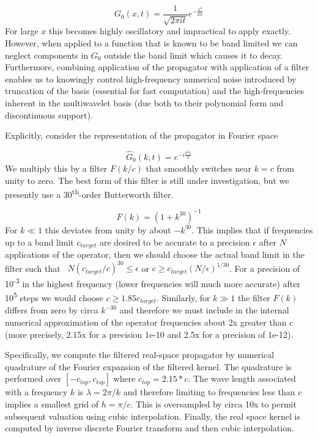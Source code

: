 \documentclass[letterpaper]{article}
\begin{document}
\begin{equation}
G_{0}(x,t)=\frac{1}{\sqrt{2\pi it}}e^{-{\frac{x^{2}}{2it}}}
\end{equation}
For large  $x$ this becomes highly oscillatory and impractical to apply exactly. However, when applied to a function
that is known to be band limited we can neglect components in  $G_{0}$ outside the band limit which causes it to decay.
Furthermore, combining application of the propagator with application of a filter enables us to knowingly control
high-frequency numerical noise introduced by truncation of the basis (essential for fast computation) and the
high-frequencies inherent in the multiwavelet basis (due both to their polynomial form and discontinuous support).

Explicitly, consider the representation of the propagator in Fourier space 

\begin{equation}
{\hat{G}}_{0}(k,t)=e^{-i\frac{k^{2}t}{2}}
\end{equation}
We multiply this by a filter  $F(k/c)$ that smoothly switches near  $k=c$ from unity to zero. The best form of this
filter is still under investigation, but we presently use a 30\textsuperscript{th}{}-order Butterworth filter. 

\begin{equation}
F(k)=\left(1+k^{30}\right)^{-1}
\end{equation}
For  $k\ll 1$ this deviates from unity by about  $-k^{30}$. This implies that if frequencies up to a band limit 
$c_{\mathit{target}}$ are desired to be accurate to a precision  $\epsilon $ after  $N$ applications of the operator,
then we should choose the actual band limit in the filter such that \  $N(c_{\mathit{target}}/c)^{30}\le \epsilon $ or 
$c\ge c_{\mathit{target}}(N/\epsilon )^{1/30}$. For a precision of 10\textsuperscript{{}-3} in the highest frequency
(lower frequencies will much more accurate) after 10\textsuperscript{5} steps we would choose  $c\ge
1.85c_{\mathit{target}}$. Similarly, for  $k\gg 1$ the filter  $F(k)$ differs from zero by circa  $k^{-30}$ and
therefore we must include in the internal numerical approximation of the operator frequencies about 2x greater than 
$c$ (more precisely, 2.15x for a precision 1e-10 and 2.5x for a precision of 1e-12).

Specifically, we compute the filtered real-space propagator by numerical quadrature of the Fourier expansion of the
filtered kernel. The quadrature is performed over  $[-c_{\mathit{top}},c_{\mathit{top}}]$ where 
$c_{\mathit{top}}=2.15\ast c$. The wave length associated with a frequency  $k$ is  $\lambda =2\pi /k$ and therefore
limiting to frequencies less than  $c$ implies a smallest grid of  $h=\pi /c$. This is oversampled by circa 10x to
permit subsequent valuation using cubic interpolation. Finally, the real space kernel is computed by inverse discrete
Fourier transform and then cubic interpolation.
\end{document}
